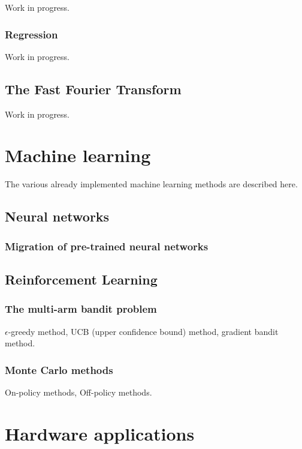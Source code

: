 \documentclass{book}
\begin{document}
Work in progress.
\subsection{Regression}

Work in progress.

\section{The Fast Fourier Transform}


Work in progress.


\chapter{Machine learning}

The various already implemented machine learning methods are described here.

\section{Neural networks}

\subsection{Migration of pre-trained neural networks}


\section{Reinforcement Learning}

\subsection{The multi-arm bandit problem}

$\epsilon$-greedy method, UCB (upper confidence bound) method, gradient bandit method.

\subsection{Monte Carlo methods}

On-policy methods, Off-policy methods.



\chapter{Hardware applications}
\end{document}
